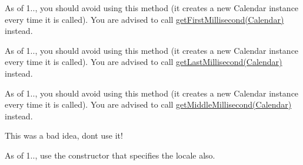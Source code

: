 \begin{DoxyRefList}
\item[\label{deprecated__deprecated000273}%
\Hypertarget{deprecated__deprecated000273}%
Member \mbox{\hyperlink{classorg_1_1jfree_1_1data_1_1time_1_1_regular_time_period_a2e46e03754784f461b73ceb910a36afa}{org.jfree.data.time.Regular\+Time\+Period.get\+First\+Millisecond}} (Time\+Zone zone)]As of 1.., you should avoid using this method (it creates a new Calendar instance every time it is called). You are advised to call \mbox{\hyperlink{classorg_1_1jfree_1_1data_1_1time_1_1_regular_time_period_a673bf019570d5e38eea9787c8e0ce42a}{get\+First\+Millisecond(\+Calendar)}} instead. 
\item[\label{deprecated__deprecated000274}%
\Hypertarget{deprecated__deprecated000274}%
Member \mbox{\hyperlink{classorg_1_1jfree_1_1data_1_1time_1_1_regular_time_period_aaeb1a139a8046725c6827b0db023efd8}{org.jfree.data.time.Regular\+Time\+Period.get\+Last\+Millisecond}} (Time\+Zone zone)]As of 1.., you should avoid using this method (it creates a new Calendar instance every time it is called). You are advised to call \mbox{\hyperlink{classorg_1_1jfree_1_1data_1_1time_1_1_regular_time_period_a5e5b6c8eec369a8e1461021b3fa602ce}{get\+Last\+Millisecond(\+Calendar)}} instead. 
\item[\label{deprecated__deprecated000275}%
\Hypertarget{deprecated__deprecated000275}%
Member \mbox{\hyperlink{classorg_1_1jfree_1_1data_1_1time_1_1_regular_time_period_a5ccb28f4990a31f2c6cd6c4e98f9ae26}{org.jfree.data.time.Regular\+Time\+Period.get\+Middle\+Millisecond}} (Time\+Zone zone)]As of 1.., you should avoid using this method (it creates a new Calendar instance every time it is called). You are advised to call \mbox{\hyperlink{classorg_1_1jfree_1_1data_1_1time_1_1_regular_time_period_acc6989cf29e1824415f9875f04933d53}{get\+Middle\+Millisecond(\+Calendar)}} instead.  
\item[\label{deprecated__deprecated000272}%
\Hypertarget{deprecated__deprecated000272}%
Member \mbox{\hyperlink{classorg_1_1jfree_1_1data_1_1time_1_1_regular_time_period_ae1eae9d84275c2518c6bbe5f11a0e1bf}{org.jfree.data.time.Regular\+Time\+Period.W\+O\+R\+K\+I\+N\+G\+\_\+\+C\+A\+L\+E\+N\+D\+AR}} ]This was a bad idea, don\textquotesingle{}t use it!  
\item[\label{deprecated__deprecated000276}%
\Hypertarget{deprecated__deprecated000276}%
Member \mbox{\hyperlink{classorg_1_1jfree_1_1data_1_1time_1_1_second_a6349bf85897f77365176fd8c3e306bc2}{org.jfree.data.time.Second.Second}} (Date time, Time\+Zone zone)]As of 1.., use the constructor that specifies the locale also.  

\end{DoxyRefList}
